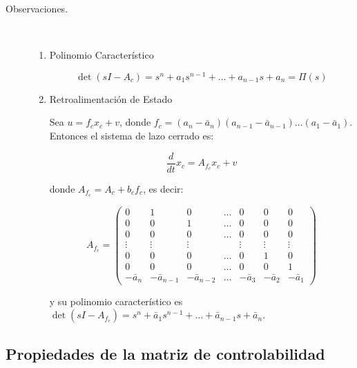 \documentclass[12pt]{article}
\numberwithin{equation}{subsection}
\begin{document}
\begin{description}
\item [Observaciones.] \mbox{}\\
\begin{enumerate}
\item Polinomio Característico

\begin{equation}
\det{(sI - A_c)} = s^n + a_1 s^{n-1} + \dots + a_{n-1} s + a_n = \Pi(s) \nonumber
\end{equation}

\item Retroalimentación de Estado

Sea $u = f_c x_c + v$, donde $f_c = (a_n - \bar{a}_n)(a_{n-1} - \bar{a}_{n-1})\dots(a_1 - \bar{a}_1)$. Entonces el sistema de lazo cerrado es:

\begin{equation}
\frac{d}{dt} x_c = A_{f_c} x_c + v
\end{equation}

donde $A_{f_c} = A_c + b_c f_c$, es decir:

\begin{equation}
A_{f_c} =
\begin{pmatrix}
0 & 1 & 0 & \dots & 0 & 0 & 0 \\
0 & 0 & 1 & \dots & 0 & 0 & 0 \\
0 & 0 & 0 & \dots & 0 & 0 & 0 \\
\vdots & \vdots & \vdots & & \vdots & \vdots & \vdots \\
0 & 0 & 0 & \dots & 0 & 1 & 0 \\
0 & 0 & 0 & \dots & 0 & 0 & 1 \\
-\bar{a}_{n} & -\bar{a}_{n-1} & -\bar{a}_{n-2} & \dots & -\bar{a}_{3} & -\bar{a}_{2} & -\bar{a}_{1}
\end{pmatrix}
\end{equation}

y su polinomio característico es $\det{(sI - A_{f_c})} = s^n + \bar{a}_1 s^{n-1} + \dots + \bar{a}_{n-1} s + \bar{a}_n$.

\end{enumerate}
\end{description}

\subsection{Propiedades de la matriz de controlabilidad}
\end{document}
